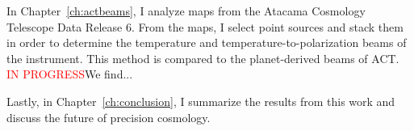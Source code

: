 In Chapter~\ref{ch:actbeams}, I analyze maps from the Atacama Cosmology Telescope Data Release 6.  From the maps, I select point sources and stack them in order to determine the temperature and temperature-to-polarization beams of the instrument.  This method is compared to the planet-derived beams of ACT.  \textcolor{red}{IN PROGRESS}We find...

Lastly, in Chapter~\ref{ch:conclusion}, I summarize the results from this work and discuss the future of precision cosmology.